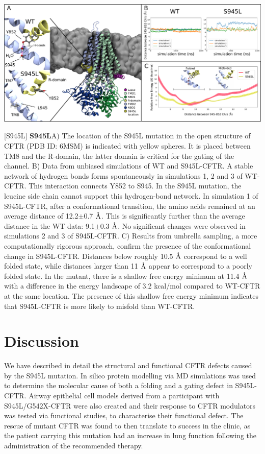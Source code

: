 \begin{center}
	\includegraphics[width=\textwidth]{figures/S945L/Figure1_MD_03082022.pdf}
\end{center}
	\captionsetup{singlelinecheck = false, justification=raggedright}
\begingroup
{}[S945L] {\textbf{S945L}}{A) The location of the S945L mutation in the open structure of CFTR (PDB ID: 6MSM) is indicated with yellow spheres. It is placed between TM8 and the R-domain, the latter domain is critical for the gating of the channel. B) Data from unbiased simulations of WT and S945L-CFTR. A stable network of hydrogen bonds forms spontaneously in simulations 1, 2 and 3 of WT-CFTR. This interaction connects Y852 to S945. In the S945L mutation, the leucine side chain cannot support this hydrogen-bond network. In simulation 1 of S945L-CFTR, after a conformational transition, the amino acids remained at an average distance of 12.2$\pm$0.7 $\textup{\AA}$. This is significantly further than the average distance in the WT data: 9.1$\pm$0.3 $\textup{\AA}$. No significant changes were observed in simulations 2 and 3 of S945L-CFTR. C) Results from umbrella sampling, a more computationally rigorous approach, confirm the presence of the conformational change in S945L-CFTR. Distances below roughly 10.5 $\textup{\AA}$ correspond to a well folded state, while distances larger than 11 $\textup{\AA}$ appear to correspond to a poorly folded state. In the mutant, there is a shallow free energy minimum at 11.4 $\textup{\AA}$ with a difference in the energy landscape of 3.2 kcal/mol compared to WT-CFTR at the same location. The presence of this shallow free energy minimum indicates that S945L-CFTR is more likely to misfold than WT-CFTR. }
\label{S945L_MD_1}
\endgroup

\section{Discussion}
We have described in detail the structural and functional CFTR defects caused by the S945L mutation. In silico protein modelling via MD simulations was used to determine the molecular cause of both a folding and a gating defect in S945L-CFTR.  Airway epithelial cell models derived from a participant with S945L/G542X-CFTR were also created and their response to CFTR modulators was tested via functional studies, to characterise their functional defect. The rescue of mutant CFTR was found to then translate to success in the clinic, as the patient carrying this mutation had an increase in lung function following the administration of the recommended therapy.

